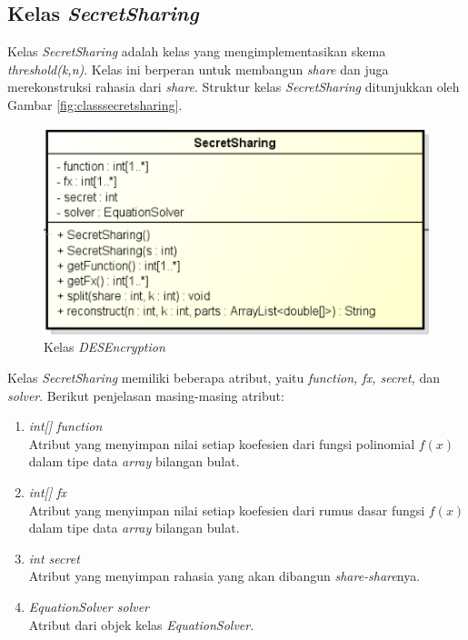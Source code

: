 \subsection{Kelas \textit{SecretSharing}}

Kelas \textit{SecretSharing} adalah kelas yang mengimplementasikan skema \textit{threshold(k,n)}. Kelas ini berperan untuk membangun \textit{share} dan juga merekonstruksi rahasia dari \textit{share}. Struktur kelas \textit{SecretSharing} ditunjukkan oleh Gambar \ref{fig:classsecretsharing}.

\begin{figure}[H]
	\centering
	\includegraphics[scale=0.7]{Gambar/class_secret_sharing}
	\caption{Kelas \textit{DESEncryption}}\label{fig:classdesencryption}
\end{figure}

Kelas \textit{SecretSharing} memiliki beberapa atribut, yaitu \textit{function, fx, secret,} dan \textit{solver}. Berikut penjelasan masing-masing atribut:

\begin{enumerate}
	\item \textit{int[] function} \\
	Atribut yang menyimpan nilai setiap koefesien dari fungsi polinomial \begin{math}f(x)\end{math} dalam tipe data \textit{array} bilangan bulat.
	\item \textit{int[] fx} \\
	Atribut yang menyimpan nilai setiap koefesien dari rumus dasar fungsi \begin{math}f(x)\end{math} dalam tipe data \textit{array} bilangan bulat.
	\item \textit{int secret} \\
	Atribut yang menyimpan rahasia yang akan dibangun \textit{share-share}nya.
	\item \textit{EquationSolver solver} \\
	Atribut dari objek kelas \textit{EquationSolver}.
\end{enumerate}


